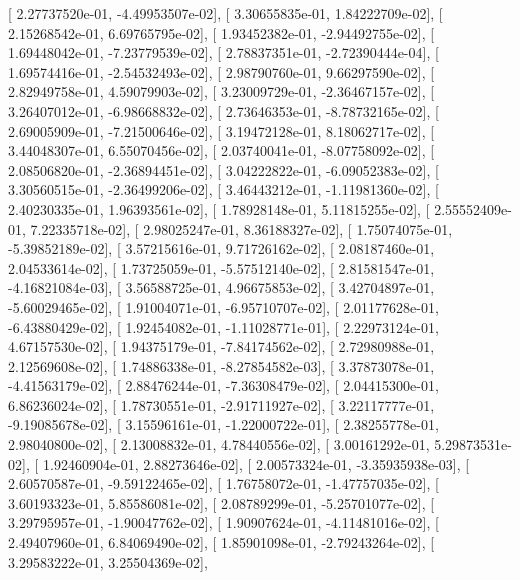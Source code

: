 \documentclass{article}
\begin{document}
       [  2.27737520e-01,  -4.49953507e-02],
       [  3.30655835e-01,   1.84222709e-02],
       [  2.15268542e-01,   6.69765795e-02],
       [  1.93452382e-01,  -2.94492755e-02],
       [  1.69448042e-01,  -7.23779539e-02],
       [  2.78837351e-01,  -2.72390444e-04],
       [  1.69574416e-01,  -2.54532493e-02],
       [  2.98790760e-01,   9.66297590e-02],
       [  2.82949758e-01,   4.59079903e-02],
       [  3.23009729e-01,  -2.36467157e-02],
       [  3.26407012e-01,  -6.98668832e-02],
       [  2.73646353e-01,  -8.78732165e-02],
       [  2.69005909e-01,  -7.21500646e-02],
       [  3.19472128e-01,   8.18062717e-02],
       [  3.44048307e-01,   6.55070456e-02],
       [  2.03740041e-01,  -8.07758092e-02],
       [  2.08506820e-01,  -2.36894451e-02],
       [  3.04222822e-01,  -6.09052383e-02],
       [  3.30560515e-01,  -2.36499206e-02],
       [  3.46443212e-01,  -1.11981360e-02],
       [  2.40230335e-01,   1.96393561e-02],
       [  1.78928148e-01,   5.11815255e-02],
       [  2.55552409e-01,   7.22335718e-02],
       [  2.98025247e-01,   8.36188327e-02],
       [  1.75074075e-01,  -5.39852189e-02],
       [  3.57215616e-01,   9.71726162e-02],
       [  2.08187460e-01,   2.04533614e-02],
       [  1.73725059e-01,  -5.57512140e-02],
       [  2.81581547e-01,  -4.16821084e-03],
       [  3.56588725e-01,   4.96675853e-02],
       [  3.42704897e-01,  -5.60029465e-02],
       [  1.91004071e-01,  -6.95710707e-02],
       [  2.01177628e-01,  -6.43880429e-02],
       [  1.92454082e-01,  -1.11028771e-01],
       [  2.22973124e-01,   4.67157530e-02],
       [  1.94375179e-01,  -7.84174562e-02],
       [  2.72980988e-01,   2.12569608e-02],
       [  1.74886338e-01,  -8.27854582e-03],
       [  3.37873078e-01,  -4.41563179e-02],
       [  2.88476244e-01,  -7.36308479e-02],
       [  2.04415300e-01,   6.86236024e-02],
       [  1.78730551e-01,  -2.91711927e-02],
       [  3.22117777e-01,  -9.19085678e-02],
       [  3.15596161e-01,  -1.22000722e-01],
       [  2.38255778e-01,   2.98040800e-02],
       [  2.13008832e-01,   4.78440556e-02],
       [  3.00161292e-01,   5.29873531e-02],
       [  1.92460904e-01,   2.88273646e-02],
       [  2.00573324e-01,  -3.35935938e-03],
       [  2.60570587e-01,  -9.59122465e-02],
       [  1.76758072e-01,  -1.47757035e-02],
       [  3.60193323e-01,   5.85586081e-02],
       [  2.08789299e-01,  -5.25701077e-02],
       [  3.29795957e-01,  -1.90047762e-02],
       [  1.90907624e-01,  -4.11481016e-02],
       [  2.49407960e-01,   6.84069490e-02],
       [  1.85901098e-01,  -2.79243264e-02],
       [  3.29583222e-01,   3.25504369e-02],
\end{document}
